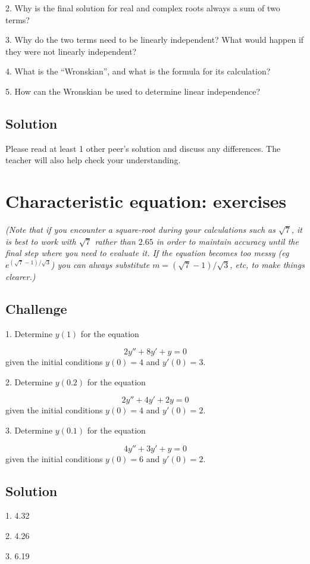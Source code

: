 2. Why is the final solution for real and complex roots always a sum of two terms?

3. Why do the two terms need to be linearly independent? What would happen if they were not linearly independent?

4. What is the ``Wronskian'', and what is the formula for its calculation?

5. How can the Wronskian be used to determine linear independence?

\subsection*{Solution}
Please read at least 1 other peer's solution and discuss any differences. The teacher will also help check your understanding.

\timebox




\newpage
\section{Characteristic equation: exercises}

\emph{(Note that if you encounter a square-root during your calculations such as $\sqrt{7}$, it is best to work with $\sqrt{7}$ rather than $2.65$ in order to maintain accuracy until the final step where you need to evaluate it. If the equation becomes too messy (eg $e^{(\sqrt{7}-1)/\sqrt{3}}$) you can always substitute $m=(\sqrt{7}-1)/\sqrt{3}$, etc, to make things clearer.)}

\subsection*{Challenge}
1. Determine $y(1)$ for the equation

\begin{equation}
    2 y''+8y'+y=0    
\end{equation}
given the initial conditions $y(0)=4$ and $y'(0)=3$.

2. Determine $y(0.2)$ for the equation

\begin{equation}
    2y''+4y'+2y=0
\end{equation}
given the initial conditions $y(0)=4$ and $y'(0)=2$.

3. Determine $y(0.1)$ for the equation

\begin{equation}
    4y''+3y'+y=0
\end{equation}
given the initial conditions $y(0)=6$ and $y'(0)=2$.


\subsection*{Solution}
1. 4.32 %

2. 4.26 %

3. 6.19 %

\timebox





